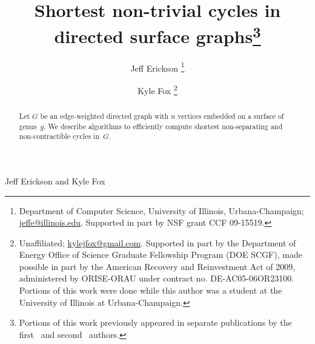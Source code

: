 \documentclass[11pt,twoside]{article}
\begin{document}
\pagestyle{myheadings}
		 {Jeff Erickson and Kyle Fox}

\begin{titlepage}

\title{Shortest non-trivial cycles in directed surface graphs\footnote{
Portions of this work previously appeared in separate publications by the first~\cite{e-sncds-11} and second~\cite{f-sntcd-13} authors.
}}

\author{
  Jeff Erickson%
  \thanks{Department of Computer Science,
  University of Illinois, Urbana-Champaign; \url{jeffe@illinois.edu}.
  Supported in part by NSF grant CCF 09-15519.
  }
  \and
  Kyle Fox%
  \thanks{Unaffiliated; \url{kylejfox@gmail.com}.
  Supported in part by
      the Department of Energy Office
      of Science Graduate Fellowship Program (DOE SCGF),
      made possible in part by the American Recovery and
      Reinvestment Act of 2009, administered by ORISE-ORAU
      under contract no. DE-AC05-06OR23100.
      Portions of this work were done while this author was a student at the University of Illinois at Urbana-Champaign.}
      }

\DRAFT

\maketitle
\begin{abstract}
Let $G$ be an edge-weighted directed graph with $n$ vertices embedded on a surface of genus~$g$.
We describe algorithms to efficiently compute shortest non-separating and non-contractible cycles in~$G$.
\end{abstract}

\noindent

\thispagestyle{empty}
\setcounter{page}{0}
\end{titlepage}







\end{document}
